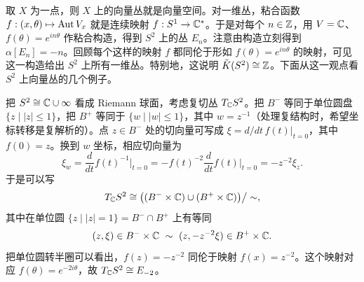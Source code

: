 
取 $X$ 为一点，则 $X$ 上的向量丛就是向量空间。对一维丛，粘合函数 $f:(x,\theta)\mapsto\operatorname{Aut} V_x$ 就是连续映射 $f:S^1\to\mathbb{C}^*$。于是对每个 $n\in\mathbb{Z}$，用 $V=\mathbb{C}$、$f(\theta)=e^{in\theta}$ 作粘合构造，得到 $S^2$ 上的丛 $E_n$。注意由构造立刻得到 $\alpha[E_n]=-n$。回顾每个这样的映射 $f$ 都同伦于形如 $f(\theta)=e^{in\theta}$ 的映射，可见这一构造给出 $S^2$ 上所有一维丛。特别地，这说明 $\tilde K(S^2)\cong\mathbb{Z}$。下面从这一观点看 $S^2$ 上向量丛的几个例子。

\begin{example}
把 $S^2\cong\mathbb{C}\cup\infty$ 看成 Riemann 球面，考虑复切丛 $T_{\mathbb{C}} S^2$。把 $B^-$ 等同于单位圆盘 $\{z\mid |z|\le1\}$，把 $B^+$ 等同于 $\{w\mid |w|\le1\}$，其中 $w=z^{-1}$（处理复结构时，希望坐标转移是复解析的）。点 $z\in B^-$ 处的切向量可写成 $\xi=d/dt\,f(t)|_{t=0}$，其中 $f(0)=z$。换到 $w$ 坐标，相应切向量为
\[
\xi_w=\frac{d}{dt}f(t)^{-1}\Big|_{t=0}=-f(t)^{-2}\frac{d}{dt}f(t)\Big|_{t=0}=-z^{-2}\xi_z.
\]
于是可以写
\[
T_{\mathbb{C}} S^2\cong\bigl((B^-\times\mathbb{C})\cup(B^+\times\mathbb{C})\bigr)\big/\sim,
\]
其中在单位圆 $\{z\mid |z|=1\}=B^-\cap B^+$ 上有等同
\[
(z,\xi)\in B^-\times\C\ \sim\ (z,-z^{-2}\xi)\in B^+\times\C.
\]
把单位圆转半圈可以看出，$f(z)=-z^{-2}$ 同伦于映射 $f(x)=z^{-2}$。这个映射对应 $f(\theta)=e^{-2i\theta}$，故 $T_{\mathbb{C}} S^2\cong E_{-2}$。
\end{example}

